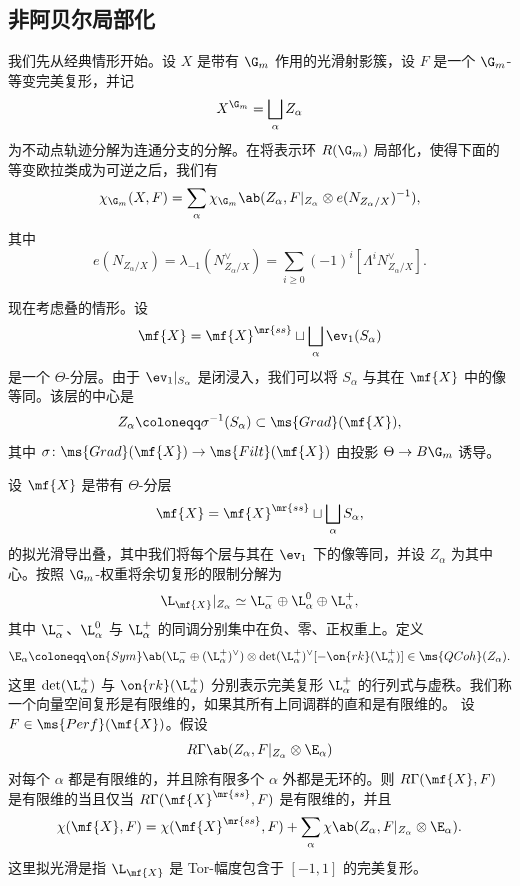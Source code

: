 \subsection{非阿贝尔局部化}%
\label{sub:Non-abelian localization}

我们先从经典情形开始。设 \(X\) 是带有 \(\G_m\) 作用的光滑射影簇，设 \(F\) 是一个 \(\G_m\)-等变完美复形，并记
\[
    X^{\G_m}=\bigsqcup_\alpha Z_\alpha
\]
为不动点轨迹分解为连通分支的分解。在将表示环 \(R(\G_m)\) 局部化，使得下面的等变欧拉类成为可逆之后，我们有
\[
    \chi_{\G_m}(X,F)
    =
    \sum_\alpha
    \chi_{\G_m}\ab(
        Z_\alpha,
        F|_{Z_\alpha}\otimes e(N_{Z_\alpha/X})^{-1}
    ),
\]
其中
\[
    e(N_{Z_\alpha/X})
    =
    \lambda_{-1}(N_{Z_\alpha/X}^\vee)
    =
    \sum_{i\geq0}(-1)^i[\Lambda^iN_{Z_\alpha/X}^\vee].
\]

现在考虑叠的情形。设
\[
    \mf{X}
    =
    \mf{X}^{\mr{ss}}
    \sqcup
    \bigsqcup_\alpha\ev_1(S_\alpha)
\]
是一个 \(\Theta\)-分层。由于 \(\ev_1|_{S_\alpha}\) 是闭浸入，我们可以将 \(S_\alpha\) 与其在 \(\mf{X}\) 中的像等同。该层的中心是
\[
    Z_\alpha\coloneqq\sigma^{-1}(S_\alpha)\subset\ms{Grad}(\mf{X}),
\]
其中 \(\sigma\colon\ms{Grad}(\mf{X})\to\ms{Filt}(\mf{X})\) 由投影 \(\Theta\to B\G_m\) 诱导。

\begin{thm}
    设 \(\mf{X}\) 是带有 \(\Theta\)-分层
    \[
        \mf{X}
        =
        \mf{X}^{\mr{ss}}
        \sqcup
        \bigsqcup_\alpha S_\alpha,
    \]
    的拟光滑导出叠，其中我们将每个层与其在 \(\ev_1\) 下的像等同，并设 \(Z_\alpha\) 为其中心。按照 \(\G_m\)-权重将余切复形的限制分解为
    \[
        \L_{\mf{X}}|_{Z_\alpha}
        \simeq
        \L_\alpha^-
        \oplus
        \L_\alpha^0
        \oplus
        \L_\alpha^+,
    \]
    其中 \(\L_\alpha^-\)、\(\L_\alpha^0\) 与 \(\L_\alpha^+\) 的同调分别集中在负、零、正权重上。定义
    \[
        \E_\alpha
        \coloneqq
        \on{Sym}\ab(
            \L_\alpha^-
            \oplus
            (\L_\alpha^+)^\vee
        )
        \otimes
        \det(\L_\alpha^+)^\vee
        [-\on{rk}(\L_\alpha^+)]
        \in
        \ms{QCoh}(Z_\alpha).
    \]
    这里 \(\det(\L_\alpha^+)\) 与 \(\on{rk}(\L_\alpha^+)\) 分别表示完美复形 \(\L_\alpha^+\) 的行列式与虚秩。我们称一个向量空间复形是有限维的，如果其所有上同调群的直和是有限维的。
    设 \(F\in\ms{Perf}(\mf{X})\)。假设
    \[
        R\Gamma\ab(
            Z_\alpha,
            F|_{Z_\alpha}\otimes\E_\alpha
        )
    \]
    对每个 \(\alpha\) 都是有限维的，并且除有限多个 \(\alpha\) 外都是无环的。则 \(R\Gamma(\mf{X},F)\) 是有限维的当且仅当 \(R\Gamma(\mf{X}^{\mr{ss}},F)\) 是有限维的，并且
    \[
        \chi(\mf{X},F)
        =
        \chi(\mf{X}^{\mr{ss}},F)
        +
        \sum_\alpha
        \chi\ab(
            Z_\alpha,
            F|_{Z_\alpha}\otimes\E_\alpha
        ).
    \]
    这里拟光滑是指 \(\L_{\mf{X}}\) 是 Tor-幅度包含于 \([-1,1]\) 的完美复形。
\end{thm}


